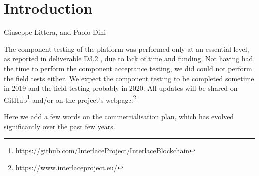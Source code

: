 \chapter{Introduction}
\label{ch:Introduction}

\vspace{-1cm}
\begin{center}
Giuseppe Littera, and Paolo Dini
\end{center}

The component testing of the platform was performed only at an essential level, as reported in deliverable D3.2 \cite{INTERLACE_D32}, due to lack of time and funding. Not having had the time to perform the component acceptance testing, we did could not perform the field tests either. We expect the component testing to be completed sometime in 2019 and the field testing probably in 2020. All updates will be shared on GitHub\footnote{\url{https://github.com/InterlaceProject/InterlaceBlockchain}} and/or on the project's webpage.\footnote{\url{https://www.interlaceproject.eu/}} 

Here we add a few words on the commercialisation plan, which has evolved significantly over the past few years.






\newpage
